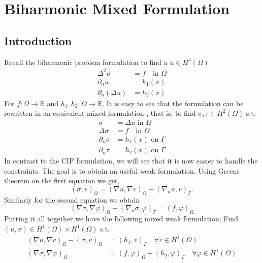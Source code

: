 
\newpage
\section{Biharmonic Mixed Formulation}%
\label{sec:biharmonic_mixed_formulation}


\subsection{Introduction}%
\label{sub:introduction}

Recall the biharmonic problem formulation to find a $u \in H^4( \Omega ) $  \[
    \begin{split}
\Delta ^2 u & = f \quad  \text{in } \Omega \\
\partial _{n} u & = h_{1}(x ) \\
\partial _{n}( \Delta u)  & = h_{2}( x)
    \end{split}
\]
For $f: \Omega  \to  \mathbb{R} $ and $h_{1},h_{2}: \Omega  \to \mathbb{R}  $. It is easy to see
that the formulation can be rewritten in an equivalent mixed formulation , that is, to find $\sigma, \tau  \in H^2( \Omega ) $ s.t. \[
    \begin{split}
\sigma   & = \Delta u  \text{ in } \Omega \\
\Delta \sigma  & = f \quad  \text{in } \Omega \\
\partial _{n} \sigma  & = h_{1}(x ) \text{ on } \Gamma  \\
\partial _{n} \tau   & = h_{2}( x) \text{ on } \Gamma
    \end{split}
\]
In contrast to the CIP formulation, we will see that it is now easier to handle the constraints.
The goal is to obtain an useful weak formulation. Using Greens theorem on the first equation we get,
\[
( \sigma, v)_{\Omega } = ( \nabla  u , \nabla v  )_{\Omega } - ( \nabla _{n} u , v) _{\Gamma }.
\]
Similarly for the second equation we obtain
\[
( \nabla \sigma , \nabla \varphi  )_{\Omega} - ( \nabla _{n} \sigma ,  \varphi )_{\Gamma } = ( f,\varphi ) _{\Omega}
\]
Putting it all together we have the following mixed weak formulation; Find $( u, \sigma ) \in H^{1}( \Omega ) \times H^{1}( \Omega )  $ s.t.  \[
    \begin{split}
     ( \nabla  u , \nabla v  )_{\Omega } -( \sigma, v)_{\Omega }  & =   ( h_{1} , v) _{\Gamma } \quad  \forall v \in H^{1}( \Omega ) \\
( \nabla \sigma , \nabla \varphi  )_{\Omega}  & = ( f,\varphi ) _{\Omega} + ( h_{2} ,  \varphi )_{\Gamma } \quad  \forall \varphi \in H^{1}( \Omega )
    \end{split}
\]



